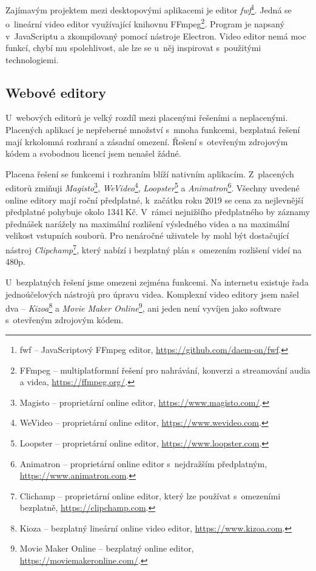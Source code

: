 Zajímavým projektem mezi desktopovými aplikacemi je editor \textit{fwf}\footnote{fwf -- JavaScriptový FFmpeg editor, \url{https://github.com/daem-on/fwf}.}. Jedná se o~lineární video editor využívající knihovnu FFmpeg\footnote{FFmpeg -- multiplatformní řešení pro nahrávání, konverzi a streamování audia a videa, \url{https://ffmpeg.org/}.}. Program je napsaný v~JavaScriptu a zkompilovaný pomocí nástroje Electron. Video editor nemá moc funkcí, chybí mu spolehlivost, ale lze se u~něj inspirovat s~použitými technologiemi.

\subsection{Webové editory}
U~webových editorů je velký rozdíl mezi placenými řešeními a neplacenými. Placených aplikací je nepřeberné množství s~mnoha funkcemi, bezplatná řešení mají krkolomná rozhraní a zásadní omezení. Řešení s~otevřeným zdrojovým kódem a svobodnou licencí jsem nenašel žádné.

Placena řešení se funkcemi i rozhraním blíží nativním aplikacím. Z~placených editorů zmiňuji \textit{Magisto}\footnote{Magisto -- proprietární online editor, \url{https://www.magisto.com/}.}, \textit{WeVideo}\footnote{WeVideo --  proprietární online editor, \url{https://www.wevideo.com}.}, \textit{Loopster}\footnote{Loopster -- proprietární online editor, \url{https://www.loopster.com}.} a \textit{Animatron}\footnote{Animatron -- proprietární online editor s~nejdražším předplatným, \url{https://www.animatron.com}.}. Všechny uvedené online editory mají roční předplatné, k~začátku roku 2019 se cena za nejlevnější předplatné pohybuje okolo 1341\,Kč. V~rámci nejnižšího předplatného by záznamy přednášek narážely na  maximální rozlišení výsledného videa a na maximální velikost vstupních souborů. Pro nenáročné uživatele by mohl být dostačující nástroj \textit{Clipchamp}\footnote{Clichamp -- proprietární online editor, který lze používat s~omezeními bezplatně, \url{https://clipchamp.com}.}, který nabízí i bezplatný plán s~omezením rozlišení videí na 480p.

U~bezplatných řešení jsme omezeni zejména funkcemi. Na internetu existuje řada jednoúčelových nástrojů pro úpravu videa. Komplexní video editory jsem našel dva -- \textit{Kizoa}\footnote{Kioza -- bezplatný lineární online video editor, \url{https://www.kizoa.com}.} a \textit{Movie Maker Online}\footnote{Movie Maker Online -- bezplatný online editor, \url{https://moviemakeronline.com/}.}, ani jeden není vyvíjen jako software s~otevřeným zdrojovým kódem.

